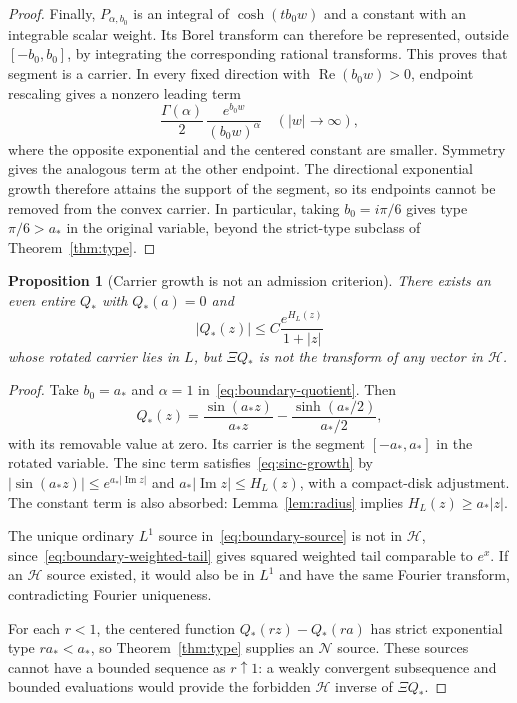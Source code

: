 \documentclass[11pt,a4paper]{article}
\numberwithin{equation}{section}
\newtheorem{proposition}[theorem]{Proposition}
\theoremstyle{definition}
\theoremstyle{remark}
\newcommand{\Hh}{\mathcal H}
\newcommand{\Nn}{\mathcal N}
\begin{document}
\begin{proof}
Finally, $P_{\alpha,b_0}$ is an integral of $\cosh(tb_0w)$ and a constant with an integrable scalar weight. Its Borel transform can therefore be represented, outside $[-b_0,b_0]$, by integrating the corresponding rational transforms. This proves that segment is a carrier. In every fixed direction with $\operatorname{Re}(b_0w)>0$, endpoint rescaling gives a nonzero leading term
\[
 \frac{\Gamma(\alpha)}2\,\frac{e^{b_0w}}{(b_0w)^\alpha}
 \quad(|w|\to\infty),
\]
where the opposite exponential and the centered constant are smaller. Symmetry gives the analogous term at the other endpoint. The directional exponential growth therefore attains the support of the segment, so its endpoints cannot be removed from the convex carrier. In particular, taking $b_0=i\pi/6$ gives type $\pi/6>a_*$ in the original variable, beyond the strict-type subclass of Theorem~\ref{thm:type}.
\end{proof}

\begin{proposition}[Carrier growth is not an admission criterion]\label{prop:sinc-warning}
There exists an even entire $Q_*$ with $Q_*(a)=0$ and
\begin{equation}\label{eq:sinc-growth}
 |Q_*(z)|\le C\frac{e^{H_L(z)}}{1+|z|}
\end{equation}
whose rotated carrier lies in $L$, but $\Xi Q_*$ is not the transform of any vector in $\Hh$.
\end{proposition}
\begin{proof}
Take $b_0=a_*$ and $\alpha=1$ in~\eqref{eq:boundary-quotient}. Then
\begin{equation}\label{eq:sinc-quotient}
 Q_*(z)=\frac{\sin(a_*z)}{a_*z}
        -\frac{\sinh(a_*/2)}{a_*/2},
\end{equation}
with its removable value at zero. Its carrier is the segment $[-a_*,a_*]$ in the rotated variable. The sinc term satisfies~\eqref{eq:sinc-growth} by
$|\sin(a_*z)|\le e^{a_*|\operatorname{Im}z|}$ and
$a_*|\operatorname{Im}z|\le H_L(z)$, with a compact-disk adjustment. The constant term is also absorbed: Lemma~\ref{lem:radius} implies $H_L(z)\ge a_*|z|$.

The unique ordinary $L^1$ source in~\eqref{eq:boundary-source} is not in $\Hh$, since~\eqref{eq:boundary-weighted-tail} gives squared weighted tail comparable to $e^x$. If an $\Hh$ source existed, it would also be in $L^1$ and have the same Fourier transform, contradicting Fourier uniqueness.

For each $r<1$, the centered function $Q_*(rz)-Q_*(ra)$ has strict exponential type $ra_*<a_*$, so Theorem~\ref{thm:type} supplies an $\Nn$ source. These sources cannot have a bounded sequence as $r\uparrow1$: a weakly convergent subsequence and bounded evaluations would provide the forbidden $\Hh$ inverse of $\Xi Q_*$.
\end{proof}
\end{document}
